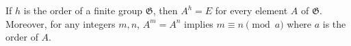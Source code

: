 If $h$ is the order of a finite group $\mathfrak{G}$, then $A^h = E$ for every element $A$ of $\mathfrak{G}$. Moreover, for any integers $m,n$, $A^m = A^n$ implies $m \equiv n \pmod{a}$ where $a$ is the order of $A$.
